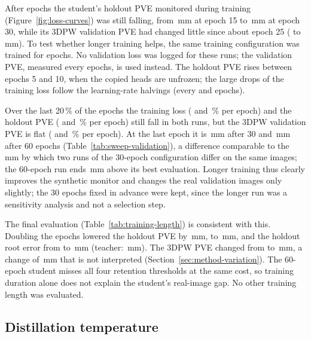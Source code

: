 After \StudentEpochs{} epochs the student's holdout PVE monitored during training (Figure~\ref{fig:loss-curves}) was
still falling, from \StudentCurveHoldFifteen\,mm at epoch 15 to \StudentCurveHoldLast\,mm at epoch 30, while its
3DPW validation PVE had changed little since about epoch 25 (\StudentCurveValTwentyFive{} to \SelThirtyValPVE\,mm).
To test whether longer training helps, the same training configuration was trained for \StudentSixtyEpochs{} epochs.
No validation loss was logged for these runs; the validation PVE, measured every \LossEvalEvery{} epochs, is used
instead. The holdout PVE rises between epochs 5 and 10, when the copied heads are unfrozen; the large drops of the
training loss follow the learning-rate halvings (every \LossLRHalfThirty{} and \LossLRHalfSixty{} epochs).

Over the last 20\,\% of the epochs the training loss (\LossThirtyTrainSlope{} and \LossSixtyTrainSlope\,\% per
epoch) and the holdout PVE (\LossThirtyHoldSlope{} and \LossSixtyHoldSlope\,\% per epoch) still fall in both runs,
but the 3DPW validation PVE is flat (\LossThirtyValSlope{} and \LossSixtyValSlope\,\% per epoch). At the last epoch it
is \SelThirtyValPVE\,mm after 30 and \SelSixtyValPVE\,mm after 60 epochs (Table~\ref{tab:sweep-validation}), a
difference comparable to the \AblRunDiffVal\,mm by which two runs of the 30-epoch configuration differ on the same
images; the 60-epoch run ends \SelSixtyGap\,mm above its best evaluation. Longer training thus clearly improves the
synthetic monitor and changes the real validation images only slightly; the 30 epochs fixed in advance were kept,
since the longer run was a sensitivity analysis and not a selection step.



The final evaluation (Table~\ref{tab:training-length}) is consistent with this. Doubling the epochs lowered the
holdout PVE by \StudentSixtyGainHoldout\,mm, to \StudentSixtyPVE\,mm, and the holdout root error from
\ResStudentRootErr{} to \StudentSixtyRootErr\,mm (teacher: \TeacherRootErrStudentJob\,mm). The 3DPW PVE changed from
\StudentThreeDPW{} to \StudentSixtyThreeDPW\,mm, a change of \StudentSixtyChangeThreeDPW\,mm that is not interpreted
(Section~\ref{sec:method-variation}). The 60-epoch
student misses all four retention thresholds at the same cost, so training duration alone does not explain the
student's real-image gap. No other training length was evaluated.

\subsection{Distillation temperature}
\label{sec:res-kd-temperature}

